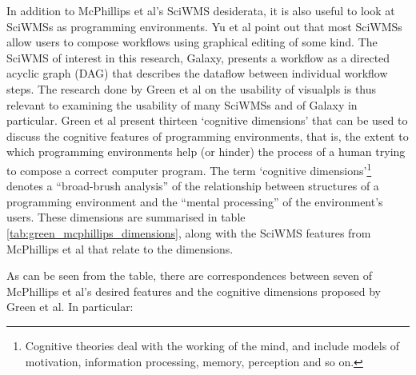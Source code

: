 \documentclass[a4paper,10pt]{scrreprt} \usepackage[utf8]{inputenc}
\begin{document}
In addition to McPhillips et al's \gls{SciWMS} desiderata, it is also useful to look at \glspl{SciWMS} as programming environments. Yu et al \cite{yu_taxonomy_2005} point out that most \glspl{SciWMS} allow users to compose \glspl{workflow} using graphical editing of some kind. The \gls{SciWMS} of interest in this research, Galaxy, presents a \gls{workflow} as a directed acyclic graph (DAG) that describes the dataflow between individual \gls{workflow} steps. The research done by Green et al \cite{green_usability_1996} on the usability of \glspl{visualpl} is thus relevant to examining the usability of many \glspl{SciWMS} and of Galaxy in particular. Green et al \cite{green_usability_1996} present thirteen `cognitive dimensions' that can be used to discuss the cognitive features of programming environments, that is, the extent to which programming environments help (or hinder) the process of a human trying to compose a correct computer program. The term `cognitive dimensions'\footnote{Cognitive theories deal 
with the working of the mind, and include models of motivation, information processing, memory, perception and so on.} denotes a ``broad-brush analysis'' of the relationship between structures of a programming environment and the ``mental processing'' of the environment's users. These dimensions are summarised in table \ref{tab:green_mcphillips_dimensions}, along with the \gls{SciWMS} features from McPhillips et al \cite{mcphillips_scientific_2009} that relate to the dimensions.

As can be seen from the table, there are correspondences between seven of McPhillips et al's desired features and the cognitive dimensions proposed by Green et al. In particular:
\end{document}
